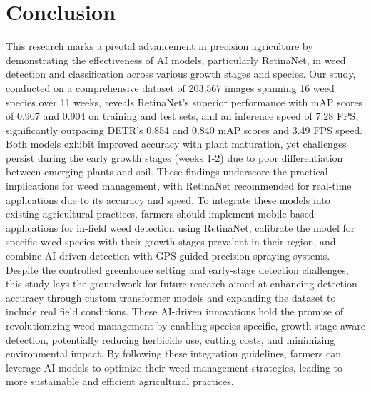 \section{Conclusion}
This research marks a pivotal advancement in precision agriculture by demonstrating the effectiveness of AI models, particularly RetinaNet, in weed detection and classification across various growth stages and species. Our study, conducted on a comprehensive dataset of 203,567 images spanning 16 weed species over 11 weeks, reveals RetinaNet's superior performance with mAP scores of 0.907 and 0.904 on training and test sets, and an inference speed of 7.28 FPS, significantly outpacing DETR's 0.854 and 0.840 mAP scores and 3.49 FPS speed. Both models exhibit improved accuracy with plant maturation, yet challenges persist during the early growth stages (weeks 1-2) due to poor differentiation between emerging plants and soil. These findings underscore the practical implications for weed management, with RetinaNet recommended for real-time applications due to its accuracy and speed. To integrate these models into existing agricultural practices, farmers should implement mobile-based applications for in-field weed detection using RetinaNet, calibrate the model for specific weed species with their growth stages prevalent in their region, and combine AI-driven detection with GPS-guided precision spraying systems. Despite the controlled greenhouse setting and early-stage detection challenges, this study lays the groundwork for future research aimed at enhancing detection accuracy through custom transformer models and expanding the dataset to include real field conditions. These AI-driven innovations hold the promise of revolutionizing weed management by enabling species-specific, growth-stage-aware detection, potentially reducing herbicide use, cutting costs, and minimizing environmental impact. By following these integration guidelines, farmers can leverage AI models to optimize their weed management strategies, leading to more sustainable and efficient agricultural practices.
